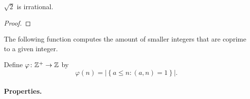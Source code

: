 \documentclass[11pt,a4paper]{article}
\begin{document}
\begin{prop}
    \(\sqrt{2}\) is irrational.
\end{prop}

\begin{proof}
    
\end{proof}


\begin{teo}
    
\end{teo}

The following function  computes the amount of smaller integers that are coprime to a given integer.
\begin{defi}
    Define \(\varphi \colon \mathbb{Z}^+\to \mathbb{Z}\) by 
    \[\varphi(n) = |\left\{ a\leq n : (a,n) = 1 \right\}|.\]
\end{defi}

\paragraph{Properties.} 
\end{document}
